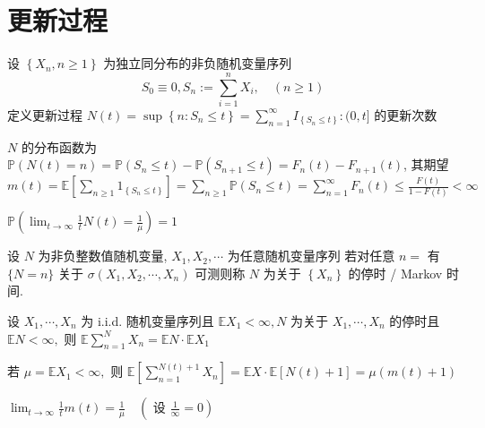 \documentclass[10pt]{yerbaformat}
\begin{document}
\section{更新过程}
\begin{definition}
    设 $\left\{X_{n}, n \geq 1\right\}$ 为独立同分布的非负随机变量序列
    $$
        S_{0} \equiv 0, S_{n}:=\sum_{i=1}^{n} X_{i}, \quad(n \geq 1)
    $$
    定义更新过程 $N(t)=\sup \left\{n: S_{n} \leq t\right\}=\sum_{n=1}^{\infty} I_{\left\{S_{n} \leq t\right\}}:(0, t]$ 的更新次数
\end{definition}

\par $N$ 的分布函数为 $\mathbb{P}(N(t)=n)=\mathbb{P}\left(S_{n} \leq t\right)-\mathbb{P}\left(S_{n+1} \leq t\right)=F_{n}(t)-F_{n+1}(t)$, 其期望 $m(t)=\mathbb{E}\left[\sum_{n \geq 1} 1_{\left\{S_{n} \leq t\right\}}\right]=\sum_{n \geq 1} \mathbb{P}\left(S_{n} \leq t\right)=\sum_{n=1}^{\infty} F_{n}(t)\leq \frac{F(t)}{1-F(t)}<\infty$

\begin{theorem}[趋近无穷速度]
    $\mathbb{P}\left(\lim _{t \rightarrow \infty} \frac{1}{t} N(t)=\frac{1}{\mu}\right)=1$
\end{theorem}

\begin{definition}[离散型停时]
    设 $N$ 为非负整数值随机变量, $X_{1}, X_{2}, \cdots$ 为任意随机变量序列 若对任意 $n=$ 有 $\{N=n\}$ 关于 $\sigma\left(X_{1}, X_{2}, \cdots, X_{n}\right)$ 可测则称 $N$ 为关于 $\left\{X_{n}\right\}$ 的停时 / Markov 时间.
\end{definition}

\begin{theorem}[Wald 等式]
    设 $X_{1}, \cdots, X_{n}$ 为 i.i.d. 随机变量序列且 $\mathbb{E} X_{1}<\infty, N$ 为关于 $X_{1}, \cdots, X_{n}$ 的停时且 $\mathbb{E} N<\infty,$ 则 $\mathbb{E} \sum_{n=1}^{N} X_{n}=\mathbb{E} N \cdot \mathbb{E} X_{1}$
\end{theorem}

\begin{corollary}
    若 $\mu=\mathbb{E} X_{1}<\infty,$ 则 $\mathbb{E}\left[\sum_{n=1}^{N(t)+1} X_{n}\right]=\mathbb{E} X \cdot \mathbb{E}[N(t)+1]=\mu(m(t)+1)$
\end{corollary}

\begin{theorem}[基本更新定理]
    $\lim _{t \rightarrow \infty} \frac{1}{t} m(t)=\frac{1}{\mu} \quad\left(\right.$ 设 $\left.\frac{1}{\infty}=0\right)$
\end{theorem}
\end{document}
